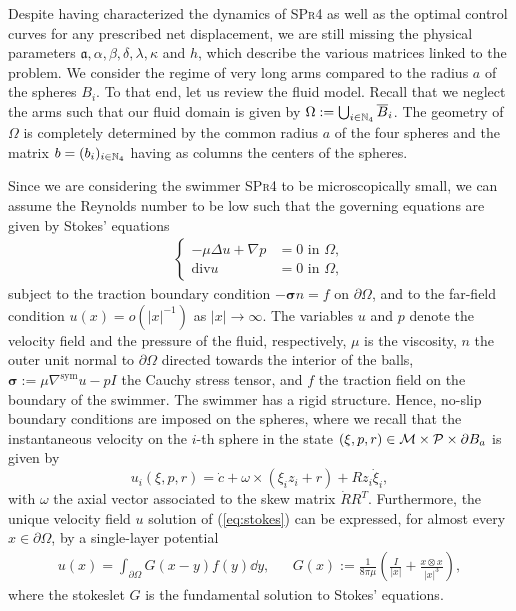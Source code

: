 \label{sec:laa}
Despite having characterized the dynamics of \textsc{SPr4} as well as the optimal control curves for any prescribed net displacement, we are still missing the physical parameters $\mathfrak{a}, \alpha, \beta, \delta, \lambda, \kappa$ and $h$, which describe the various matrices linked to the problem. We consider the regime of very long arms compared to the radius $a$ of the spheres $B_i$. To that end, let us review the fluid model. Recall that we neglect the arms such that our fluid domain is given by $\Omega := \bigcup_{i \in \mathbb{N}_4} \overline{B}_i$. The geometry of $\Omega$ is completely determined by the common radius $a$ of the four spheres and the matrix $b = (b_i)_{i \in \mathbb{N}_4}$ having as columns the centers of the spheres.

Since we are considering the swimmer \textsc{SPr4} to be microscopically small, we can assume the Reynolds number to be low such that the governing equations are given by Stokes' equations
\begin{align}
\label{eq:stokes}
\begin{cases}
- \mu \Delta u + \nabla p &= 0 \text{ in } \Omega,\\
\mathrm{div} u  &= 0  \text{ in } \Omega,
\end{cases}
\end{align}
subject to the traction boundary condition $- \boldsymbol\sigma n = f$ on $\partial \Omega$, and to the far-field condition $u(x) = o(|x|^{-1})$ as $|x| \to \infty$. The variables $u$ and $p$ denote the velocity field and the pressure of the fluid, respectively, $\mu$ is the viscosity, $n$ the outer unit normal to $\partial \Omega$ directed towards the interior of the balls, $\boldsymbol \sigma := \mu \nabla^{\mathrm{sym}}u - p I$ the Cauchy stress tensor, and $f$ the traction field on the boundary of the swimmer. The swimmer has a rigid structure. Hence, no-slip boundary conditions are imposed on the spheres, where we recall that the instantaneous velocity on the $i$-th sphere in the state $(\xi, p, r) \in \mathcal{M} \times \mathcal{P} \times \partial B_a $ is given by
\begin{equation}
	u_i(\xi, p, r) = \dot{c} + \omega \times (\xi_i z_i + r) + R z_i \dot{\xi}_i,
\end{equation}
with $\omega$ the axial vector associated to the skew matrix $\dot{R} R^T$. Furthermore, the unique velocity field $u$ solution of (\ref{eq:stokes}) can be expressed, for almost every $x \in \partial \Omega$, by a single-layer potential
\begin{align}
\label{eq:single_layer}
	u(x) = \int_{\partial \Omega} G(x - y) f(y) \dd y, & & G(x) := \frac{1}{8 \pi \mu} \left ( \frac{I}{|x|} + \frac{x \otimes x}{|x|^3} \right ),
\end{align}
where the stokeslet $G$ is the fundamental solution to Stokes' equations.

